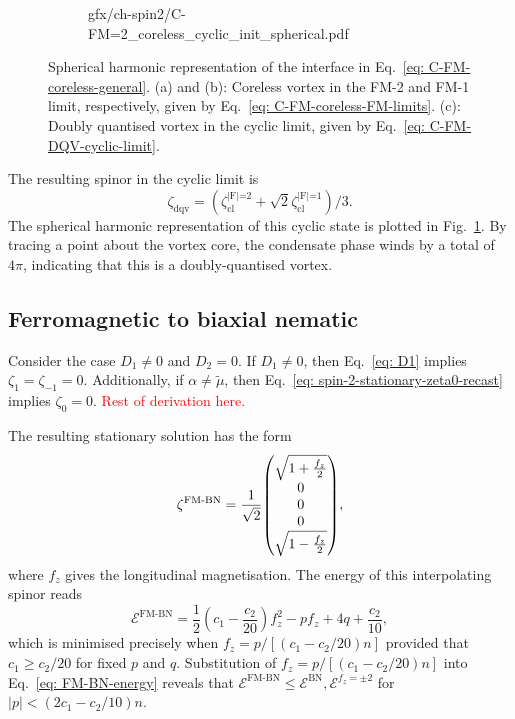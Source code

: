 \begin{figure}
\begin{subfigure}{0.49\textwidth}
        {gfx/ch-spin2/C-FM=2_coreless_cyclic_init_spherical.pdf}
        \caption{\label{subfig: C-FM-cyclic-DQV}}
    \end{subfigure}
    \caption{\label{fig: C-FM-coreless-initial-states}Spherical harmonic
        representation of the interface in Eq.~\eqref{eq: C-FM-coreless-general}.
        (a) and (b): Coreless vortex in the FM-2 and FM-1 limit, respectively,
        given by Eq.~\eqref{eq: C-FM-coreless-FM-limits}.
        (c): Doubly quantised vortex in the cyclic limit, given by
        Eq.~\eqref{eq: C-FM-DQV-cyclic-limit}.}
\end{figure}
The resulting spinor in the cyclic limit is
\begin{equation}\label{eq: C-FM-DQV-cyclic-limit}
    \zeta_\text{dqv}
    = \left(\zeta^\text{|F|=2}_\text{cl}
    + \sqrt{2}\zeta^\text{|F|=1}_\text{cl}\right) / 3.
\end{equation}
The spherical harmonic representation of this cyclic state is plotted in
Fig.~\ref{subfig: C-FM-cyclic-DQV}.
By tracing a point about the vortex core, the condensate phase winds by a total
of \(4\pi \), indicating that this is a doubly-quantised vortex.

\subsection{Ferromagnetic to biaxial nematic}
Consider the case \(D_1 \neq 0\) and \(D_2 = 0\).
If \(D_1 \neq 0\), then Eq.~\eqref{eq: D1} implies \(\zeta_1=\zeta_{-1} = 0\).
Additionally, if \(\alpha \neq \tilde{\mu}\),
then Eq.~\eqref{eq: spin-2-stationary-zeta0-recast} implies \(\zeta_0 = 0\).
\textcolor{red}{Rest of derivation here.}

The resulting stationary solution has the form
\begin{equation}\label{eq: FM-BN-interpolating-spinor}
    \zeta^\text{FM-BN} = \frac{1}{\sqrt{2}}\mqty(
    \sqrt{1 + \frac{f_z}{2}} \\ 0 \\ 0 \\ 0 \\
    \sqrt{1 - \frac{f_z}{2}}),
\end{equation}
where \(f_z\) gives the longitudinal magnetisation.
The energy of this interpolating spinor reads
\begin{equation}\label{eq: FM-BN-energy}
    \mathcal{E}^\text{FM-BN} = \frac{1}{2}\left(c_1-\frac{c_2}{20}\right)f_z^2
    - p f_z + 4q + \frac{c_2}{10},
\end{equation}
which is minimised precisely when \(f_z = p / [(c_1-c_2/20)n]\) provided that
\(c_1 \geq c_2/20\) for fixed \(p\) and \(q\).
Substitution of \(f_z = p / [(c_1-c_2/20)n]\) into Eq.~\eqref{eq: FM-BN-energy}
reveals that \(\mathcal{E}^\text{FM-BN} \leq \mathcal{E}^\text{BN},
\mathcal{E}^{f_z=\pm 2}\) for \(|p| < (2c_1-c_2/10)n\).

